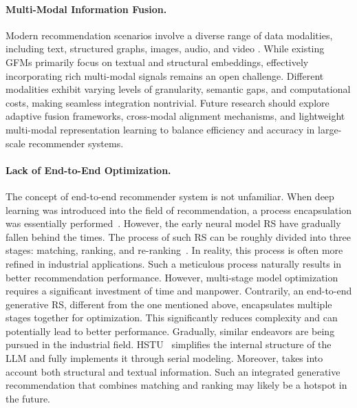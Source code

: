 \paragraph{Multi-Modal Information Fusion.}
Modern recommendation scenarios involve a diverse range of data modalities, including text, structured graphs, images, audio, and video \cite{tao2020mgat}. While existing GFMs primarily focus on textual and structural embeddings, effectively incorporating rich multi-modal signals remains an open challenge. Different modalities exhibit varying levels of granularity, semantic gaps, and computational costs, making seamless integration nontrivial. Future research should explore adaptive fusion frameworks, cross-modal alignment mechanisms, and lightweight multi-modal representation learning to balance efficiency and accuracy in large-scale recommender systems.

\paragraph{Lack of End-to-End Optimization.}  
The concept of end-to-end recommender system is not unfamiliar. When deep learning was introduced into the field of recommendation, a process encapsulation was essentially performed~\cite{covington2016deep}. However, the early neural model RS have gradually fallen behind the times. The process of such RS can be roughly divided into three stages: matching, ranking, and re-ranking~\cite{gao2023survey}. In reality, this process is often more refined in industrial applications. Such a meticulous process naturally results in better recommendation performance. However, multi-stage model optimization requires a significant investment of time and manpower. Contrarily, an end-to-end generative RS, different from the one mentioned above, encapsulates multiple stages together for optimization. This significantly reduces complexity and can potentially lead to better performance. Gradually, similar endeavors are being pursued in the industrial field. HSTU~\cite{zhai2024actions} simplifies the internal structure of the LLM and fully implements it through serial modeling. Moreover, \cite{wang2024llm} takes into account both structural and textual information. Such an integrated generative recommendation that combines matching and ranking may likely be a hotspot in the future.

